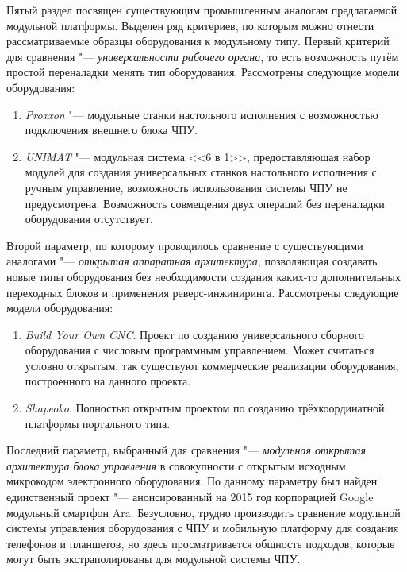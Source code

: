 Пятый раздел посвящен существующим промышленным аналогам предлагаемой модульной платформы. Выделен ряд критериев, по которым можно отнести рассматриваемые образцы оборудования к модульному типу. Первый критерий для сравнения "--- \textit{универсальности рабочего органа}, то есть возможность путём простой переналадки менять тип оборудования. Рассмотрены следующие модели оборудования: 

\begin{enumerate}
	\item\textit{Proxxon} "--- модульные станки настольного исполнения с возможностью подключения внешнего блока ЧПУ.
	\item\textit{UNIMAT} "--- модульная система <<6 в 1>>, предоставляющая набор модулей для создания универсальных станков настольного исполнения с ручным управление, возможность использования системы ЧПУ не предусмотрена. Возможность совмещения двух операций без переналадки оборудования отсутствует.
\end{enumerate}	

Второй параметр, по которому проводилось сравнение с существующими аналогами "--- \textit{открытая аппаратная архитектура}, позволяющая создавать новые типы оборудования без необходимости создания каких-то дополнительных переходных блоков и применения реверс-инжиниринга. Рассмотрены следующие модели оборудования:

\begin{enumerate}
	\item\textit{Build Your Own CNC}. Проект по созданию универсального сборного оборудования с числовым программным управлением. Может считаться условно открытым, так существуют коммерческие реализации оборудования, построенного на данного проекта.
	\item\textit{Shapeoko}. Полностью открытым проектом по созданию трёхкоординатной платформы портального типа.
\end{enumerate}

Последний параметр, выбранный для сравнения "--- \textit{модульная открытая архитектура блока управления} в совокупности с открытым исходным микрокодом электронного оборудования. По данному параметру был найден единственный проект "--- анонсированный на 2015 год корпорацией Google модульный смартфон Ara. Безусловно, трудно производить сравнение модульной системы управления оборудования с ЧПУ и мобильную платформу для создания телефонов и планшетов, но здесь просматривается общность подходов, которые могут быть экстраполированы для модульной системы ЧПУ.

